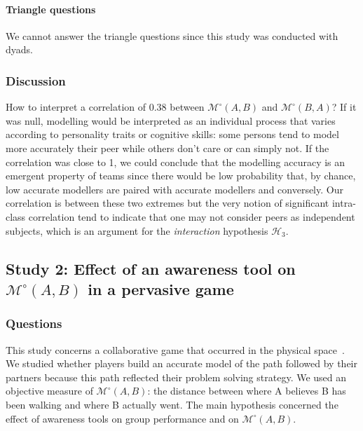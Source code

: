 \documentclass[twocolumn]{article}
\newcommand{\gModel}[2]{{$\mathcal{M}^{\circ}(#1, #2)$}}
\begin{document}
\paragraph{Triangle questions} We cannot answer the triangle questions since
this study was conducted with dyads.

\subsubsection*{Discussion}

How to interpret a correlation of 0.38 between \gModel{A}{B} and \gModel{B}{A}?
If it was null, modelling would be interpreted as an individual process that
varies according to personality traits or cognitive skills: some persons tend to
model more accurately their peer while others don't care or can simply not. If
the correlation was close to 1, we could conclude that the modelling accuracy is
an emergent property of teams since there would be low probability that, by
chance, low accurate modellers are paired with accurate modellers and
conversely. Our correlation is between these two extremes but the very notion of
significant intra-class correlation tend to indicate that one may not consider
peers as independent subjects, which is an argument for the \emph{interaction}
hypothesis $\mathcal{H}_{3}$. 





\subsection{Study 2: Effect of an awareness tool on \gModel{A}{B}  in a pervasive
game}

\subsubsection*{Questions}

This study concerns a collaborative game that occurred in the physical
space~\cite{nova2006underwhelming}. We studied whether players build an accurate
model of the path followed by their partners because this path reflected their
problem solving strategy. We used an objective measure of \gModel{A}{B}: the
distance between where A believes B has been walking and where B actually went.
The main hypothesis concerned the effect of awareness tools on group performance
and on \gModel{A}{B}. 
\end{document}

